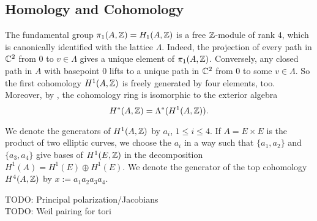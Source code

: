 \subsection{Homology and Cohomology}
The fundamental group $\pi_1(A,\mathbb{Z}) = H_1(A,\mathbb{Z})$ is a free $\mathbb{Z}$-module of rank $4$, which is canonically identified with the lattice $\Lambda$. Indeed, the projection of every path in $\mathbb{C}^2$ from $0$ to $v\in \Lambda$ gives a unique element of $\pi_1(A,\mathbb{Z})$. Conversely, any closed path in $A$ with basepoint $0$ lifts to a unique path in $\mathbb{C}^2$ from $0$ to some $v\in\Lambda$.
So the first cohomology $H^1(A,\mathbb{Z})$ is freely generated by four elements, too. Moreover, by \cite[Sect.~I.1]{Mumford}, the cohomology ring is isomorphic to the exterior algebra
$$
H^*(A,\mathbb{Z}) = \Lambda^*(H^1(A,\mathbb{Z})).
$$
\begin{notation} \label{TorusClasses}
We denote the generators of $H^1(A,\mathbb{Z})$ by $a_i$, $1\leq i\leq 4$. If $A=E\times E$ is the product of two elliptic curves, we choose the $a_i$ in a way such that $\{a_1,a_2\}$ and $\{a_3,a_4\}$ give bases of $H^1(E,\mathbb{Z})$ in the decomposition $H^1(A) = H^1(E)\oplus H^1(E)$.
We denote the generator of the top cohomology $H^4(A,\mathbb{Z})$ by $x := a_1 a_2 a_3 a_4$.
\end{notation}




TODO: Principal polarization/Jacobians \\
TODO: Weil pairing for tori